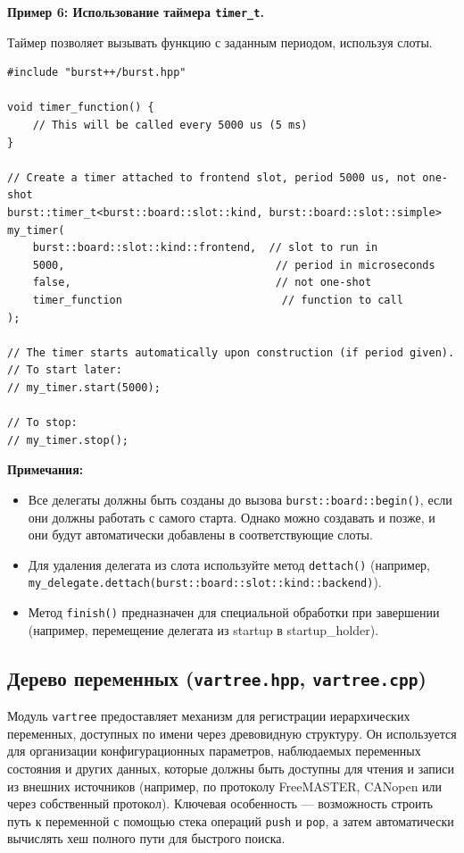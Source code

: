 \documentclass[a4paper,12pt]{article}
\begin{document}
\textbf{Пример 6: Использование таймера \texttt{timer\_t}.}

Таймер позволяет вызывать функцию с заданным периодом, используя слоты.

\begin{lstlisting}[caption={Using timer\_t for periodic execution}]
#include "burst++/burst.hpp"

void timer_function() {
    // This will be called every 5000 us (5 ms)
}

// Create a timer attached to frontend slot, period 5000 us, not one-shot
burst::timer_t<burst::board::slot::kind, burst::board::slot::simple> my_timer(
    burst::board::slot::kind::frontend,  // slot to run in
    5000,                                 // period in microseconds
    false,                                // not one-shot
    timer_function                         // function to call
);

// The timer starts automatically upon construction (if period given).
// To start later:
// my_timer.start(5000);

// To stop:
// my_timer.stop();
\end{lstlisting}

\textbf{Примечания:}
\begin{itemize}
    \item Все делегаты должны быть созданы до вызова \texttt{burst::board::begin()}, если они должны работать с самого старта. Однако можно создавать и позже, и они будут автоматически добавлены в соответствующие слоты.
    \item Для удаления делегата из слота используйте метод \texttt{dettach()} (например, \texttt{my\_delegate.dettach(burst::board::slot::kind::backend)}).
    \item Метод \texttt{finish()} предназначен для специальной обработки при завершении (например, перемещение делегата из startup в startup\_holder).
\end{itemize}
\subsection{Дерево переменных (\texttt{vartree.hpp}, \texttt{vartree.cpp})}

Модуль \texttt{vartree} предоставляет механизм для регистрации иерархических переменных, доступных по имени через древовидную структуру. Он используется для организации конфигурационных параметров, наблюдаемых переменных состояния и других данных, которые должны быть доступны для чтения и записи из внешних источников (например, по протоколу FreeMASTER, CANopen или через собственный протокол). Ключевая особенность — возможность строить путь к переменной с помощью стека операций \texttt{push} и \texttt{pop}, а затем автоматически вычислять хеш полного пути для быстрого поиска.
\end{document}
